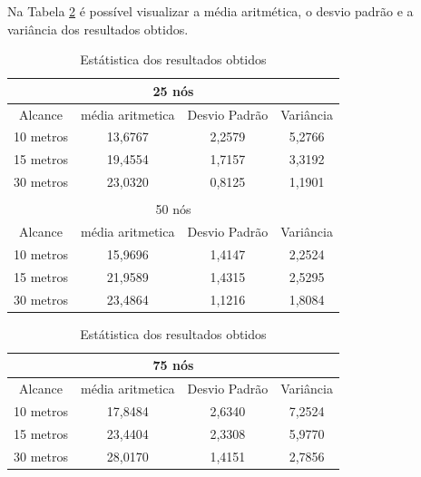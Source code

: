 	Na Tabela \ref{tab:estatiscaResultadosObtidosSemInfraestrutura} é possível visualizar a média aritmética, o desvio padrão e a variância dos resultados obtidos. 

	\begin{table}[!htb]
	    \caption{Estátistica dos resultados obtidos}
	    \label{tab:estatiscaResultadosObtidosSemInfraestrutura}
	    \centering
	    \tiny
	    \begin{minipage}{.5\linewidth}
	      
	      \centering
	        \begin{tabular}{|c|c|c|c|}

			\hline
			\multicolumn{4}{|c|}{25 nós} \\ \hline
			Alcance   & média aritmetica &	Desvio Padrão &	Variância  \\ \hline
			10 metros &	13,6767 & 2,2579 &	5,2766  \\ \hline
			15 metros &	19,4554 & 1,7157 &	3,3192  \\ \hline
			30 metros &	23,0320 & 0,8125 &	1,1901 \\ \hline

			\multicolumn{4}{|c|}{} \\ \hline

			\multicolumn{4}{|c|}{50 nós} \\ \hline
			Alcance   & média aritmetica &	Desvio Padrão &	Variância  \\ \hline
			10 metros &	15,9696	& 1,4147 & 2,2524  \\ \hline
			15 metros &	21,9589	& 1,4315 & 2,5295  \\ \hline
			30 metros &	23,4864	& 1,1216 & 1,8084 \\ \hline

		\end{tabular}
	    \end{minipage}%
	    \begin{minipage}{.5\linewidth}
	      \centering
	        \begin{tabular}{|c|c|c|c|}
	        \hline
			\multicolumn{4}{|c|}{75 nós} \\ \hline
			Alcance   & média aritmetica &	Desvio Padrão &	Variância  \\ \hline
			10 metros &	17,8484 & 2,6340 & 7,2524  \\ \hline
			15 metros &	23,4404 & 2,3308 & 5,9770  \\ \hline
			30 metros &	28,0170 & 1,4151 & 2,7856 \\ \hline


\end{tabular}
\end{minipage}
\end{table}
